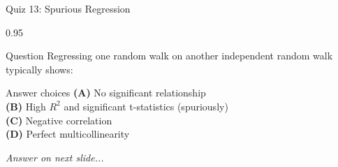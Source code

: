 \documentclass[9pt, aspectratio=169, t]{beamer}
\begin{document}
\begin{frame}{Quiz 13: Spurious Regression}
    \begin{cminipage}{0.95\textwidth}
    \begin{alertblock}{Question}
        Regressing one random walk on another independent random walk typically shows:
    \end{alertblock}

    \vspace{0.4cm}

    \begin{block}{Answer choices}
        \textcolor{MainBlue}{\textbf{(A)}} No significant relationship\\[3pt]
        \textcolor{MainBlue}{\textbf{(B)}} High $R^2$ and significant t-statistics (spuriously)\\[3pt]
        \textcolor{MainBlue}{\textbf{(C)}} Negative correlation\\[3pt]
        \textcolor{MainBlue}{\textbf{(D)}} Perfect multicollinearity
    \end{block}

    \vspace{0.5cm}

    \begin{center}
        \textit{Answer on next slide...}
    \end{center}
    \end{cminipage}
\end{frame}
\end{document}
